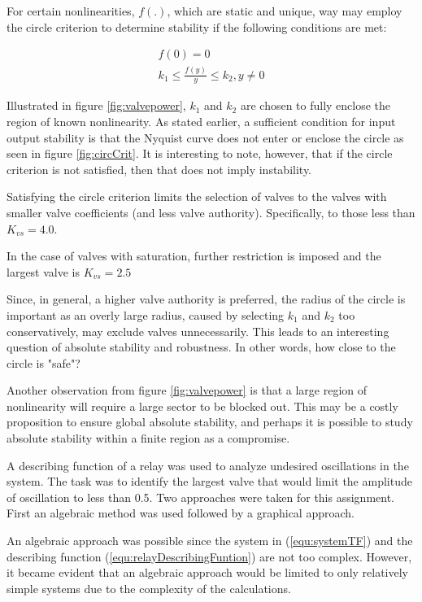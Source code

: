 \documentclass[a4paper, titlepage]{article}
\begin{document}
For certain nonlinearities, $f(.)$, which are static and unique, way may employ the circle criterion to determine stability if the following conditions are met:

\begin{equation}
\begin{split}
f(0) = 0 \\
k_{1} {\leq} \frac{f(y)}{y} {\leq} k_{2},  y {\neq} 0
\end{split}
\end{equation}

Illustrated in figure \ref{fig:valvepower}, $k_{1}$ and $k_{2}$ are chosen to fully enclose the region of known nonlinearity.  As stated earlier, a sufficient condition for input output stability is that the Nyquist curve does not enter or enclose the circle as seen in figure \ref{fig:circCrit}. It is interesting to note, however, that if the circle criterion is not satisfied, then that does not imply instability.   

Satisfying the circle criterion limits the selection of valves to the valves with smaller valve coefficients (and less valve authority).  Specifically, to those less than $K_{vs}=4.0$.

In the case of valves with saturation, further restriction is imposed and the largest valve is $K_{vs}=2.5$

Since, in general, a higher valve authority is preferred, the radius of the circle is important as an overly large radius, caused by selecting $k_{1}$ and $k_{2}$ too conservatively,  may exclude valves unnecessarily. This leads to an interesting question of absolute stability and robustness.  In other words, how close to the circle is "safe"?

Another observation from figure \ref{fig:valvepower} is that a large region of nonlinearity will require a large sector to be blocked out.  This may be a costly proposition to ensure global absolute stability, and perhaps it is possible to study absolute stability within a finite region as a compromise.

A describing function of a relay was used to analyze undesired oscillations in the system.  The task was to identify the largest valve that would limit the amplitude of oscillation to less than 0.5.
Two approaches were taken for this assignment.  First an algebraic method was used followed by a graphical approach.

An algebraic approach was possible since the system in (\ref{equ:systemTF}) and the describing function (\ref{equ:relayDescribingFuntion}) are not too complex.  However, it became evident that an algebraic approach would be limited to only relatively simple systems due to the complexity of the calculations.
\end{document}
